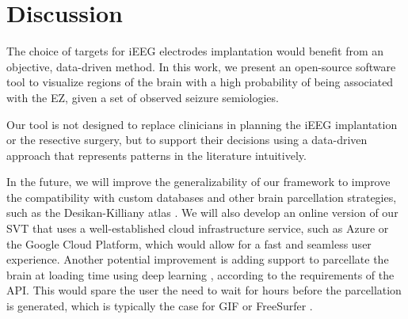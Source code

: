 \section{Discussion}

The choice of targets for \ac{iEEG} electrodes implantation would benefit from an objective, data-driven method.
In this work, we present an open-source software tool to visualize regions of the brain with a high probability of being associated with the \ac{EZ}, given a set of observed seizure semiologies.

Our tool is not designed to replace clinicians in planning the \ac{iEEG} implantation or the resective surgery, but to support their decisions using a data-driven approach that represents patterns in the literature intuitively.

In the future, we will improve the generalizability of our framework to improve the compatibility with custom databases and other brain parcellation strategies, such as the Desikan-Killiany atlas \cite{desikan_automated_2006}.
We will also develop an online version of our \ac{SVT} that uses a well-established cloud infrastructure service, such as Azure or the Google Cloud Platform, which would allow for a fast and seamless user experience.
Another potential improvement is adding support to parcellate the brain at loading time using deep learning \cite{li_compactness_2017,perez-garcia_fepegarhighresnet_2019}, according to the requirements of the \ac{API}.
This would spare the user the need to wait for hours before the parcellation is generated, which is typically the case for \ac{GIF} \cite{cardoso_geodesic_2015} or FreeSurfer%
.





